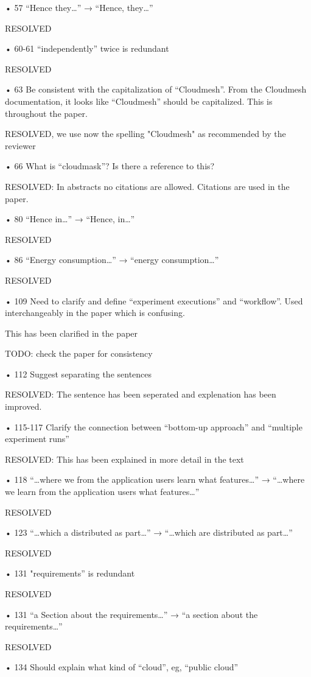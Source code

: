 • 57 “Hence they…” → “Hence, they…”

    RESOLVED

• 60-61 “independently” twice is redundant

    RESOLVED

• 63 Be consistent with the capitalization of “Cloudmesh”. From the Cloudmesh
documentation, it looks like “Cloudmesh” should be capitalized. This is throughout the
paper.

    RESOLVED, we use now the spelling "Cloudmesh" as recommended by the reviewer

• 66 What is “cloudmask”? Is there a reference to this?

    RESOLVED: In abstracts no citations are allowed. Citations are used in the paper.
    
• 80 “Hence in…” → “Hence, in…”

    RESOLVED
    
• 86 “Energy consumption…” → “energy consumption…”

    RESOLVED

• 109 Need to clarify and define “experiment executions” and “workflow”. Used
interchangeably in the paper which is confusing.

    This has been clarified in the paper 

    TODO: check the paper for consistency

• 112 Suggest separating the sentences

    RESOLVED: The sentence has been seperated and explenation has been improved.
    
• 115-117 Clarify the connection between “bottom-up approach” and “multiple experiment
runs”

    RESOLVED: This has been explained in more detail in the text

• 118 “…where we from the application users learn what features…” → “…where we
learn from the application users what features…”

    RESOLVED 
    
• 123 “…which a distributed as part…” → “…which are distributed as part…”

    RESOLVED

• 131 "requirements” is redundant

    RESOLVED
    
• 131 “a Section about the requirements…” → “a section about the requirements…”

    RESOLVED

• 134 Should explain what kind of “cloud”, eg, “public cloud”

